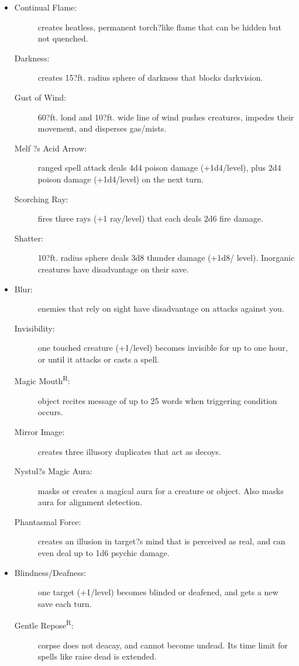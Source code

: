 \documentclass[DIV=14, paper=a4, fontsize=10pt, twocolumn, twoside]{scrartcl}
\begin{document}
\begin{itemize}[align=parleft,labelwidth=1cm]
\begin{description}
\end{description}
\renewcommand{\labelitemi}{Evoc}\item
\begin{description}
 \item[Continual Flame:] creates heatless, permanent torch?like flame that can be hidden but not quenched.
 \item[Darkness:] creates 15?ft. radius sphere of darkness that blocks darkvision.
 \item[Gust of Wind:] 60?ft. lond and 10?ft. wide line of wind pushes creatures, impedes their movement, and disperses gas/mists.
 \item[Melf ?s Acid Arrow:] ranged spell attack deals 4d4 poison damage (+1d4/level), plus 2d4 poison damage (+1d4/level) on the next turn.
 \item[Scorching Ray:] fires three rays (+1 ray/level) that each deals 2d6 fire damage.
 \item[Shatter:] 10?ft. radius sphere deals 3d8 thunder damage (+1d8/ level). Inorganic creatures have disadvantage on their save.
\end{description}
\renewcommand{\labelitemi}{Illus}\item
\begin{description}
 \item[Blur:] enemies that rely on sight have disadvantage on attacks against you.
 \item[Invisibility:] one touched creature (+1/level) becomes invisible for up to one hour, or until it attacks or casts a spell.
 \item[Magic Mouth\textsuperscript{R}:] object recites message of up to 25 words when triggering condition occurs.
 \item[Mirror Image:] creates three illusory duplicates that act as decoys.
 \item[Nystul?s Magic Aura:] masks or creates a magical aura for a creature or object. Also masks aura for alignment detection.
 \item[Phantasmal Force:] creates an illusion in target?s mind that is perceived as real, and can even deal up to 1d6 psychic damage. 
\end{description}
\renewcommand{\labelitemi}{Necro}\item
\begin{description}
 \item[Blindness/Deafness:] one target (+1/level) becomes blinded or deafened, and gets a new save each turn.
 \item[Gentle Repose\textsuperscript{R}:] corpse does not deacay, and cannot become undead. Its time limit for spells like raise dead is extended.

\end{description}
\end{itemize}
\end{document}
